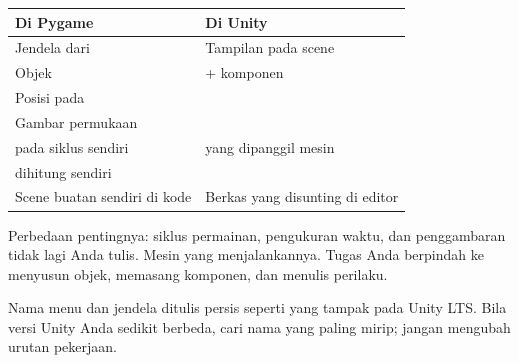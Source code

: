 {\small
\renewcommand{\arraystretch}{1.35}
\begin{tabularx}{\linewidth}{@{}L{4.6cm} Y@{}}
\toprule
\textbf{Di Pygame} & \textbf{Di Unity} \\
\midrule
Jendela dari  & Tampilan  pada scene \\
Objek  &  + komponen \\
Posisi  pada  &  \\
Gambar permukaan &  \\
 pada siklus sendiri &  yang dipanggil mesin \\
 dihitung sendiri &  \\
Scene buatan sendiri di kode & Berkas  yang disunting di editor \\
\bottomrule
\end{tabularx}
}

Perbedaan pentingnya: siklus permainan, pengukuran waktu, dan penggambaran
tidak lagi Anda tulis. Mesin yang menjalankannya. Tugas Anda berpindah ke
menyusun objek, memasang komponen, dan menulis perilaku.


Nama menu dan jendela ditulis persis seperti yang tampak pada Unity LTS.
Bila versi Unity Anda sedikit berbeda, cari nama yang paling mirip; jangan
mengubah urutan pekerjaan.

